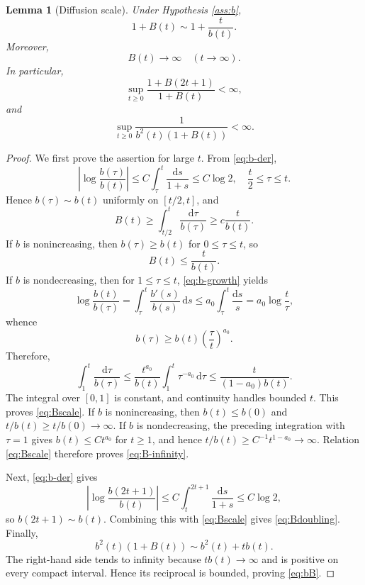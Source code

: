 \documentclass[11pt,reqno]{amsart}
\newtheorem{lemma}[theorem]{Lemma}
\theoremstyle{definition}
\theoremstyle{remark}
\begin{document}
	\begin{lemma}[Diffusion scale]
		\label{lem:B}
		Under Hypothesis \ref{ass:b},
		\begin{equation}
			\label{eq:Bscale}
			1+B(t)\sim1+\frac{t}{b(t)}.
		\end{equation}
		Moreover,
		\begin{equation}
			\label{eq:B-infinity}
			B(t)\longrightarrow\infty
			\quad(t\to\infty).
		\end{equation}
		In particular,
		\begin{equation}
			\label{eq:Bdoubling}
			\sup_{t\geq0}\frac{1+B(2t+1)}{1+B(t)}<\infty,
		\end{equation}
		and
		\begin{equation}
			\label{eq:bB}
			\sup_{t\geq0}\frac{1}{b^2(t)(1+B(t))}<\infty.
		\end{equation}
	\end{lemma}
	
	\begin{proof}
		We first prove the assertion for large $t$. From \eqref{eq:b-der},
		$$
		\left|\log\frac{b(\tau)}{b(t)}\right|
		\leq C\int_\tau^t\frac{\mathrm{d}s}{1+s}
		\leq C\log2,
		\quad \frac{t}{2}\leq\tau\leq t.
		$$
		Hence $b(\tau)\sim b(t)$ uniformly on $[t/2,t]$, and
		$$
		B(t)\geq\int_{t/2}^t\frac{\mathrm{d}\tau}{b(\tau)}
		\geq c\frac{t}{b(t)}.
		$$
		If $b$ is nonincreasing, then $b(\tau)\geq b(t)$ for $0\leq\tau\leq t$, so
		$$
		B(t)\leq\frac{t}{b(t)}.
		$$
		If $b$ is nondecreasing, then for $1\leq\tau\leq t$, \eqref{eq:b-growth} yields
		$$
		\log\frac{b(t)}{b(\tau)}
		=\int_\tau^t\frac{b'(s)}{b(s)}\,\mathrm{d}s
		\leq a_0\int_\tau^t\frac{\mathrm{d}s}{s}
		=a_0\log\frac{t}{\tau},
		$$
		whence
		$$
		b(\tau)\geq b(t)\left(\frac{\tau}{t}\right)^{a_0}.
		$$
		Therefore,
		$$
		\int_1^t\frac{\mathrm{d}\tau}{b(\tau)}
		\leq\frac{t^{a_0}}{b(t)}\int_1^t\tau^{-a_0}\,\mathrm{d}\tau
		\leq\frac{t}{(1-a_0)b(t)}.
		$$
		The integral over $[0,1]$ is constant, and continuity handles bounded $t$. This proves \eqref{eq:Bscale}. If $b$ is nonincreasing, then $b(t)\leq b(0)$ and $t/b(t)\geq t/b(0)\to\infty$. If $b$ is nondecreasing, the preceding integration with $\tau=1$ gives $b(t)\leq C t^{a_0}$ for $t\geq1$, and hence $t/b(t)\geq C^{-1}t^{1-a_0}\to\infty$. Relation \eqref{eq:Bscale} therefore proves \eqref{eq:B-infinity}.
		
		Next, \eqref{eq:b-der} gives
		$$
		\left|\log\frac{b(2t+1)}{b(t)}\right|
		\leq C\int_t^{2t+1}\frac{\mathrm{d}s}{1+s}
		\leq C\log2,
		$$
		so $b(2t+1)\sim b(t)$. Combining this with \eqref{eq:Bscale} gives \eqref{eq:Bdoubling}. Finally,
		$$
		b^2(t)(1+B(t))\sim b^2(t)+tb(t).
		$$
		The right-hand side tends to infinity because $tb(t)\to\infty$ and is positive on every compact interval. Hence its reciprocal is bounded, proving \eqref{eq:bB}.
	\end{proof}
	
\end{document}
